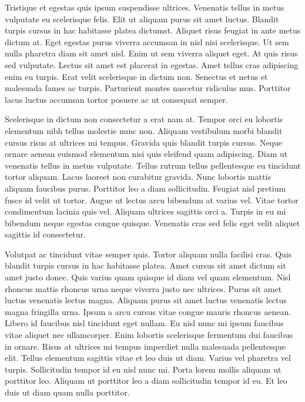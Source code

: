\documentclass[11pt,a4paper]{article}
\begin{document}
Tristique et egestas quis ipsum suspendisse ultrices. Venenatis tellus in metus vulputate eu scelerisque felis. Elit ut aliquam purus sit amet luctus. Blandit turpis cursus in hac habitasse platea dictumst. Aliquet risus feugiat in ante metus dictum at. Eget egestas purus viverra accumsan in nisl nisi scelerisque. Ut sem nulla pharetra diam sit amet nisl. Enim ut sem viverra aliquet eget. At quis risus sed vulputate. Lectus sit amet est placerat in egestas. Amet tellus cras adipiscing enim eu turpis. Erat velit scelerisque in dictum non. Senectus et netus et malesuada fames ac turpis. Parturient montes nascetur ridiculus mus. Porttitor lacus luctus accumsan tortor posuere ac ut consequat semper.

Scelerisque in dictum non consectetur a erat nam at. Tempor orci eu lobortis elementum nibh tellus molestie nunc non. Aliquam vestibulum morbi blandit cursus risus at ultrices mi tempus. Gravida quis blandit turpis cursus. Neque ornare aenean euismod elementum nisi quis eleifend quam adipiscing. Diam ut venenatis tellus in metus vulputate. Tellus rutrum tellus pellentesque eu tincidunt tortor aliquam. Lacus laoreet non curabitur gravida. Nunc lobortis mattis aliquam faucibus purus. Porttitor leo a diam sollicitudin. Feugiat nisl pretium fusce id velit ut tortor. Augue ut lectus arcu bibendum at varius vel. Vitae tortor condimentum lacinia quis vel. Aliquam ultrices sagittis orci a. Turpis in eu mi bibendum neque egestas congue quisque. Venenatis cras sed felis eget velit aliquet sagittis id consectetur.

Volutpat ac tincidunt vitae semper quis. Tortor aliquam nulla facilisi cras. Quis blandit turpis cursus in hac habitasse platea. Amet cursus sit amet dictum sit amet justo donec. Quis varius quam quisque id diam vel quam elementum. Nisl rhoncus mattis rhoncus urna neque viverra justo nec ultrices. Purus sit amet luctus venenatis lectus magna. Aliquam purus sit amet luctus venenatis lectus magna fringilla urna. Ipsum a arcu cursus vitae congue mauris rhoncus aenean. Libero id faucibus nisl tincidunt eget nullam. Eu nisl nunc mi ipsum faucibus vitae aliquet nec ullamcorper. Enim lobortis scelerisque fermentum dui faucibus in ornare. Risus at ultrices mi tempus imperdiet nulla malesuada pellentesque elit. Tellus elementum sagittis vitae et leo duis ut diam. Varius vel pharetra vel turpis. Sollicitudin tempor id eu nisl nunc mi. Porta lorem mollis aliquam ut porttitor leo. Aliquam ut porttitor leo a diam sollicitudin tempor id eu. Et leo duis ut diam quam nulla porttitor.
\end{document}
